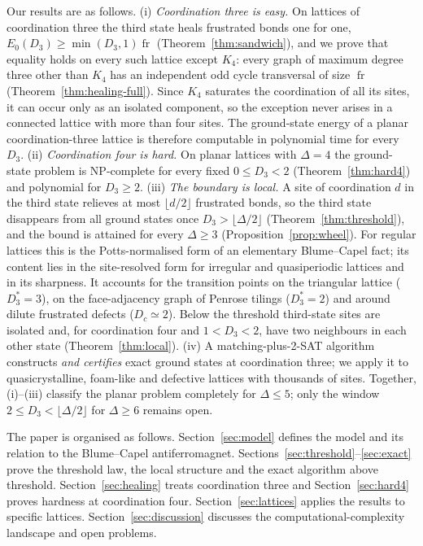 \documentclass[aps,pre,twocolumn,superscriptaddress,showpacs]{revtex4-2}
\theoremstyle{definition}
\theoremstyle{remark}
\newcommand{\fr}{\operatorname{fr}}
\begin{document}
Our results are as follows.
(i) \emph{Coordination three is easy.} On lattices of coordination three the third state
heals frustrated bonds one for one, $E_0(D_3)\ge\min(D_3,1)\fr$ (Theorem~\ref{thm:sandwich}), and
we prove that equality holds on every such lattice except $K_4$: every graph of maximum degree
three other than $K_4$ has an independent odd cycle transversal of size $\fr$
(Theorem~\ref{thm:healing-full}). Since $K_4$ saturates the coordination of all its sites, it
can occur only as an isolated component, so the exception never arises in a connected lattice
with more than four sites. The ground-state energy of a planar coordination-three lattice
is therefore computable in polynomial time for every $D_3$.
(ii) \emph{Coordination four is hard.} On planar lattices with $\Delta=4$ the ground-state
problem is NP-complete for every fixed $0\le D_3<2$ (Theorem~\ref{thm:hard4}) and polynomial for
$D_3\ge2$.
(iii) \emph{The boundary is local.} A site of coordination $d$ in the third state relieves at
most $\lfloor d/2\rfloor$ frustrated bonds, so the third state disappears from all ground states
once $D_3>\lfloor\Delta/2\rfloor$ (Theorem~\ref{thm:threshold}), and the bound is attained for every
$\Delta\ge3$ (Proposition~\ref{prop:wheel}). For regular lattices this is the Potts-normalised form
of an elementary Blume--Capel fact; its content lies in the site-resolved form for irregular and
quasiperiodic lattices and in its sharpness. It accounts for the transition points on the
triangular lattice ($D_3^*=3$), on the face-adjacency graph of Penrose tilings ($D_3^*=2$) and
around dilute frustrated defects ($D_c\simeq2$). Below the threshold third-state sites are
isolated and, for coordination four and $1<D_3<2$, have two neighbours in each other state
(Theorem~\ref{thm:local}).
(iv) A matching-plus-2-SAT algorithm constructs \emph{and certifies} exact ground states at
coordination three; we apply it to quasicrystalline, foam-like and defective lattices with
thousands of sites.
Together, (i)--(iii) classify the planar problem completely for $\Delta\le5$; only the window
$2\le D_3<\lfloor\Delta/2\rfloor$ for $\Delta\ge6$ remains open.

The paper is organised as follows. Section~\ref{sec:model} defines the model and its relation to
the Blume--Capel antiferromagnet. Sections~\ref{sec:threshold}--\ref{sec:exact} prove the
threshold law, the local structure and the exact algorithm above threshold.
Section~\ref{sec:healing} treats coordination three and Section~\ref{sec:hard4} proves hardness
at coordination four. Section~\ref{sec:lattices} applies the results to specific lattices. Section~\ref{sec:discussion} discusses the computational-complexity
landscape and open problems.
\end{document}
